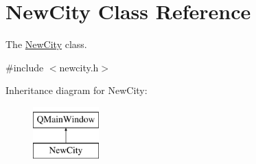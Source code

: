 \hypertarget{class_new_city}{}\section{New\+City Class Reference}
\label{class_new_city}


The \hyperlink{class_new_city}{New\+City} class.  




{\ttfamily \#include $<$newcity.\+h$>$}

Inheritance diagram for New\+City\+:\begin{figure}[H]
\begin{center}
\leavevmode
\includegraphics[height=2.000000cm]{class_new_city}
\end{center}
\end{figure}
